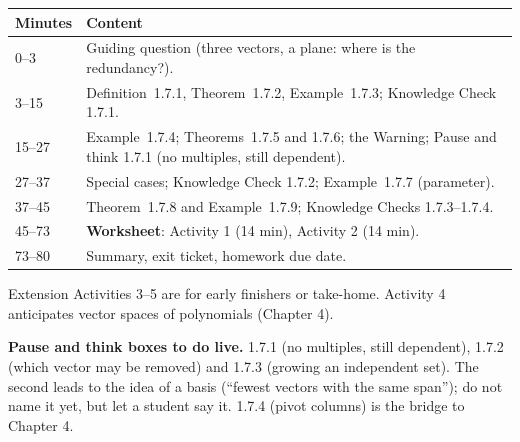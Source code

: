 \documentclass[11pt]{article}
\begin{document}
\begin{tabular}{@{}p{1.1in}p{4.6in}@{}}\toprule
Minutes & Content\\\midrule
0--3 & Guiding question (three vectors, a plane: where is the redundancy?).\\
3--15 & Definition~1.7.1, Theorem~1.7.2, Example~1.7.3; Knowledge Check 1.7.1.\\
15--27 & Example~1.7.4; Theorems~1.7.5 and 1.7.6; the Warning; Pause and think 1.7.1 (no multiples, still dependent).\\
27--37 & Special cases; Knowledge Check 1.7.2; Example~1.7.7 (parameter).\\
37--45 & Theorem~1.7.8 and Example~1.7.9; Knowledge Checks 1.7.3--1.7.4.\\
45--73 & \textbf{Worksheet}: Activity 1 (14 min), Activity 2 (14 min).\\
73--80 & Summary, exit ticket, homework due date.\\\bottomrule
\end{tabular}

Extension Activities 3--5 are for early finishers or take-home. Activity 4 anticipates vector spaces of polynomials (Chapter 4).

\begin{tip}
\textbf{Pause and think boxes to do live.} 1.7.1 (no multiples, still dependent), 1.7.2 (which vector may be removed) and 1.7.3 (growing an independent set). The second leads to the idea of a basis (``fewest vectors with the same span''); do not name it yet, but let a student say it. 1.7.4 (pivot columns) is the bridge to Chapter 4.
\end{tip}
\end{document}
